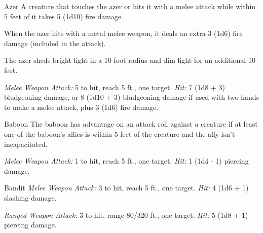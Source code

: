 \documentclass[10pt,a4paper,twoside,bg=print,twocolumn,openany,nodeprecatedcode]{dndbook}
\begin{document}
\begin{DndMonster}[float=t]{Azer}
\DndMonsterBasics[
armor-class = {17 (natural armor)},
hit-points = {\DndDice{6d8 + 12}},
speed = {30 ft.}
]
\DndMonsterAbilityScores[
 str = 17,
 dex = 12,
 con = 15,
 int = 12,
 wis = 13,
 cha = 10
]
\DndMonsterDetails[
saving-throws = {Con +4},
damage-immunities = {fire, poison},
condition-immunities = {poisoned},
languages = {Ignan},
challenge = 2,
]
A creature that touches the azer or hits it with a melee attack while within 5 feet of it takes 5 (1d10) fire damage.

When the azer hits with a metal melee weapon, it deals an extra 3 (1d6) fire damage (included in the attack).

The azer sheds bright light in a 10-foot radius and dim light for an additional 10 feet.

\textsl{Melee Weapon Attack:} 5 to hit, reach 5 ft., one target. \textsl{Hit:} 7 (1d8 + 3) bludgeoning damage, or 8 (1d10 + 3) bludgeoning damage if used with two hands to make a melee attack, plus 3 (1d6) fire damage.

\end{DndMonster}



\begin{DndMonster}[float=t]{Baboon}
\DndMonsterBasics[
armor-class = {12},
hit-points = {\DndDice{1d6}},
speed = {30 ft., climb 30 ft.}
]
\DndMonsterAbilityScores[
 str = 8,
 dex = 14,
 con = 11,
 int = 4,
 wis = 12,
 cha = 6
]
\DndMonsterDetails[
challenge = 0,
]
The baboon has advantage on an attack roll against a creature if at least one of the baboon's allies is within 5 feet of the creature and the ally isn't incapacitated.

\textsl{Melee Weapon Attack:} 1 to hit, reach 5 ft., one target. \textsl{Hit:} 1 (1d4 - 1) piercing damage.

\end{DndMonster}



\begin{DndMonster}[float=t]{Bandit}
\DndMonsterBasics[
armor-class = {12 (\textit{leather armor})},
hit-points = {\DndDice{2d8 + 2}},
speed = {30 ft.}
]
\DndMonsterAbilityScores[
 str = 11,
 dex = 12,
 con = 12,
 int = 10,
 wis = 10,
 cha = 10
]
\DndMonsterDetails[
languages = {any one language (usually Common)},
challenge = 1/8,
]
\textsl{Melee Weapon Attack:} 3 to hit, reach 5 ft., one target. \textsl{Hit:} 4 (1d6 + 1) slashing damage.

\textsl{Ranged Weapon Attack:} 3 to hit, range 80/320 ft., one target. \textsl{Hit:} 5 (1d8 + 1) piercing damage.

\end{DndMonster}
\end{document}
